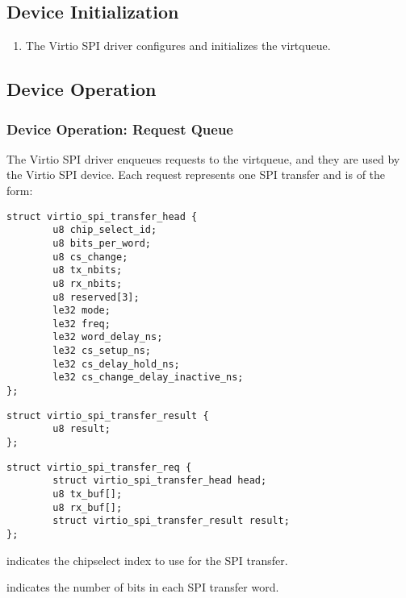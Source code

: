 \subsection{Device Initialization}\label{sec:Device Types / SPI Controller Device / Device Initialization}

\begin{enumerate}
\item The Virtio SPI driver configures and initializes the virtqueue.
\end{enumerate}

\subsection{Device Operation}\label{sec:Device Types / SPI Controller Device / Device Operation}

\subsubsection{Device Operation: Request Queue}\label{sec:Device Types / SPI Controller Device / Device Operation: Request Queue}

The Virtio SPI driver enqueues requests to the virtqueue, and they are used by the Virtio SPI device.
Each request represents one SPI transfer and is of the form:

\begin{lstlisting}
struct virtio_spi_transfer_head {
        u8 chip_select_id;
        u8 bits_per_word;
        u8 cs_change;
        u8 tx_nbits;
        u8 rx_nbits;
        u8 reserved[3];
        le32 mode;
        le32 freq;
        le32 word_delay_ns;
        le32 cs_setup_ns;
        le32 cs_delay_hold_ns;
        le32 cs_change_delay_inactive_ns;
};
\end{lstlisting}

\begin{lstlisting}
struct virtio_spi_transfer_result {
        u8 result;
};
\end{lstlisting}

\begin{lstlisting}
struct virtio_spi_transfer_req {
        struct virtio_spi_transfer_head head;
        u8 tx_buf[];
        u8 rx_buf[];
        struct virtio_spi_transfer_result result;
};
\end{lstlisting}

 indicates the chipselect index to use for the SPI transfer.

 indicates the number of bits in each SPI transfer word.

